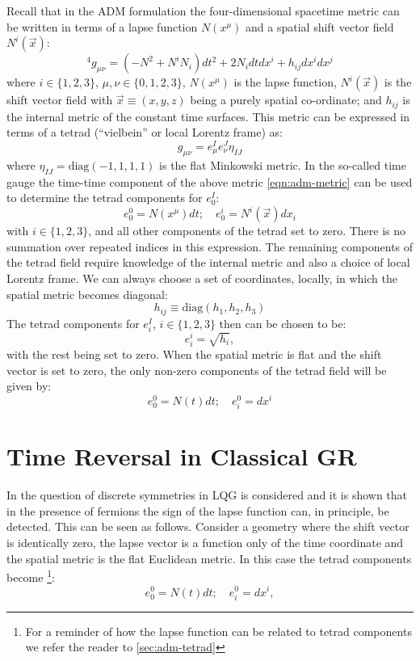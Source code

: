\documentclass[preprint]{SciPost}
\theoremstyle{plain} %
\begin{document}
Recall that in the ADM formulation the four-dimensional spacetime metric can be written in terms of a lapse function $ N(x^\mu) $ and a spatial shift vector field $ N^i(\vec{x}) $:
\begin{equation}\label{eqn:adm-metric}
	{}^4 g_{\mu\nu}  = (- N^2 + N^i N_i) dt^2 + 2 N_i dt dx^i + h_{ij} dx^i dx^j
\end{equation}
where $ i \in \{1,2,3\} $, $ \mu,\nu \in \{0,1,2,3\} $, $ N(x^\mu) $ is the lapse function, $ N^i(\vec{x}) $ is the shift vector field with $ \vec{x} \equiv (x,y,z) $ being a purely spatial co-ordinate; and $ h_{ij} $ is the internal metric of the constant time surfaces. This metric can be expressed in terms of a tetrad (``vielbein'' or local Lorentz frame) as:
\[ g_{\mu\nu} = e_\mu^I e_\nu^J \eta_{IJ} \]
where $ \eta_{IJ} = \text{diag}(-1,1,1,1) $ is the flat Minkowski metric. In the so-called time gauge the time-time component of the above metric \eqref{eqn:adm-metric} can be used to determine the tetrad components for $ e_0^I $:
\begin{equation}\label{eqn:timelike-tetrad}
	e_0^0 = N(x^\mu) dt; \quad e_0^i = N^i(\vec{x}) dx_i
\end{equation}
with $ i \in \{1,2,3\} $, and all other components of the tetrad set to zero. There is no summation over repeated indices in this expression. The remaining components of the tetrad field require knowledge of the internal metric and also a choice of local Lorentz frame. We can always choose a set of coordinates, locally, in which the spatial metric becomes diagonal:
\begin{equation}\label{eqn:diag-metric}
	h_{ij} \equiv \text{diag}(h_1, h_2, h_3)
\end{equation}
The tetrad components for $ e_i^I $, $ i \in \{1,2,3\} $ then can be chosen to be:
\begin{equation}\label{eqn:diag-tetrad-metric}
	e_i^i = \sqrt{h_i},
\end{equation}
with the rest being set to zero. When the spatial metric is flat and the shift vector is set to zero, the only non-zero components of the tetrad field will be given by:
\[ e_0^0 = N(t) dt; \quad e_i^0 = d x^i \]

\section{Time Reversal in Classical GR}\label{sec:gr-time-reversal}

In \cite{Christodoulou2012How-to-detect,Rovelli2012Discrete} the question of discrete symmetries in LQG is considered and it is shown that in the presence of fermions the sign of the lapse function can, in principle, be detected. This can be seen as follows. Consider a geometry where the shift vector is identically zero, the lapse vector is a function only of the time coordinate and the spatial metric is the flat Euclidean metric. In this case the tetrad components become \footnote{For a reminder of how the lapse function can be related to tetrad components we refer the reader to \autoref{sec:adm-tetrad}}:
\begin{equation}\label{eqn:lapse-tetrad}
e_0^0 = N(t) dt; \quad e_i^0 = d x^i,
\end{equation}
\end{document}
